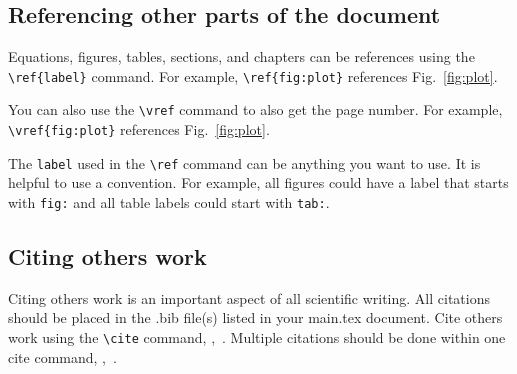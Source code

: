 \subsection{Referencing other parts of the document}\label{Sect:ref}
Equations, figures, tables, sections, and chapters can be references using the \verb|\ref{label}| command.  For example, \verb|\ref{fig:plot}| references Fig.~\ref{fig:plot}.  

You can also use the \verb|\vref| command to also get the page number.  For example, \verb|\vref{fig:plot}| references Fig.~\vref{fig:plot}.

The \verb|label| used in the \verb|\ref| command can be anything you want to use. It is helpful to use a convention.  For example, all figures could have a label that starts with \verb|fig:| and all table labels could start with \verb|tab:|.

\subsection{Citing others work}\label{Sect:cite}
Citing others work is an important aspect of all scientific writing.  All citations should be placed in the .bib file(s) listed in your main.tex document.  Cite others work using the \verb|\cite| command, \eg,~\cite{owkes_mesh-decoupled_2015}.  Multiple citations should be done within one cite command, \eg,~\cite{desjardins_direct_2013,owkes_discontinuous_2013,owkes_computational_2014}.  





